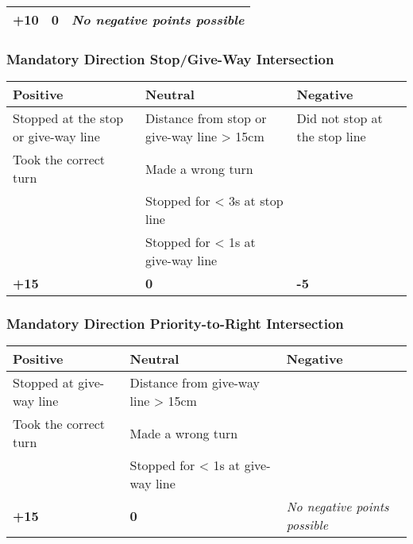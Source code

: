 {\begin{highlight}
\begin{table}[H]
\begin{tabularx}{\textwidth}{XXX}
				\topstrut
				\textbf{+10}                           & \textbf{0}                         & \textit{No negative points possible} \\
				\bottomrule
			\end{tabularx}
		\end{table}

		\subsubsection*{Mandatory Direction Stop/Give-Way Intersection}
		\begin{table}[H]
			\begin{tabularx}{\textwidth}{XXX}
				\toprule
				\textbf{Positive}                    & \textbf{Neutral}                           & \textbf{Negative}                              \\
				\midrule
				Stopped at the stop or give-way line & Distance from stop or give-way line > 15cm & Did not stop at the stop line \footnotemark[3] \\
				Took the correct turn                & Made a wrong turn \footnotemark[4]         &                                                \\
				                                     & Stopped for < 3s at stop line              &                                                \\
				                                     & Stopped for < 1s at give-way line          &                                                \\
				\topstrut
				\textbf{+15}                         & \textbf{0}                                 & \textbf{-5}                                    \\
				\bottomrule
			\end{tabularx}
		\end{table}

		\subsubsection*{Mandatory Direction Priority-to-Right Intersection}
		\begin{table}[H]
			\begin{tabularx}{\textwidth}{XXX}
				\toprule
				\textbf{Positive}        & \textbf{Neutral}                   & \textbf{Negative}                    \\
				\midrule
				Stopped at give-way line & Distance from give-way line > 15cm &                                      \\
				Took the correct turn    & Made a wrong turn \footnotemark[4] &                                      \\
				                         & Stopped for < 1s at give-way line  &                                      \\
				\topstrut
				\textbf{+15}             & \textbf{0}                         & \textit{No negative points possible} \\
				\bottomrule
			\end{tabularx}
		\end{table}


\end{highlight}}
